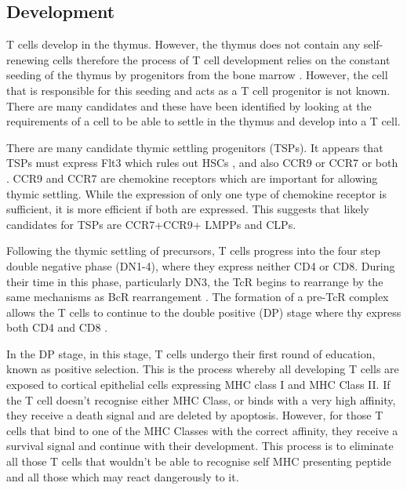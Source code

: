 \subsection{Development}

T cells develop in the thymus.
However, the thymus does not contain any self-renewing cells therefore the process of T cell development relies on the constant seeding of the thymus by progenitors from the bone marrow \citep{Zlotoff2011}.
However, the cell that is responsible for this seeding and acts as a T cell progenitor is not known.
There are many candidates and these have been identified by looking at the requirements of a cell to be able to settle in the thymus and develop into a T cell.

There are many candidate thymic settling progenitors (TSPs).
It appears that TSPs must express Flt3 which rules out HSCs \citep{Zlotoff2011}, and also CCR9 or CCR7 or both \citep{Zlotoff2010}.
CCR9 and CCR7 are chemokine receptors which are important for allowing thymic settling. 
While the expression of only one type of chemokine receptor is sufficient, it is more efficient if both are expressed.
This suggests that likely candidates for TSPs are CCR7+CCR9+ LMPPs and CLPs\citep{Zlotoff2011}.


Following the thymic settling of precursors, T cells progress into the four step double negative phase (DN1-4), where they express neither CD4 or CD8.
During their time in this phase, particularly DN3, the TcR begins to rearrange by the same mechanisms as BcR rearrangement \citep{Starr2003}.
The formation of a pre-TcR complex allows the T cells to continue to the double positive (DP) stage where thy express both CD4 and CD8 \citep{Zuniga1996}.

In the DP stage, in this stage, T cells undergo their first round of education, known as positive selection.
This is the process whereby all developing T cells are exposed to cortical epithelial cells expressing MHC class I and MHC Class II.
If the T cell doesn't recognise either MHC Class, or binds with a very high affinity, they receive a death signal and are deleted by apoptosis.
However, for those T cells that bind to one of the MHC Classes with the correct affinity, they receive a survival signal and continue with their development.
This process is to eliminate all those T cells that wouldn't be able to recognise self MHC presenting peptide and all those which  may react dangerously to it.

